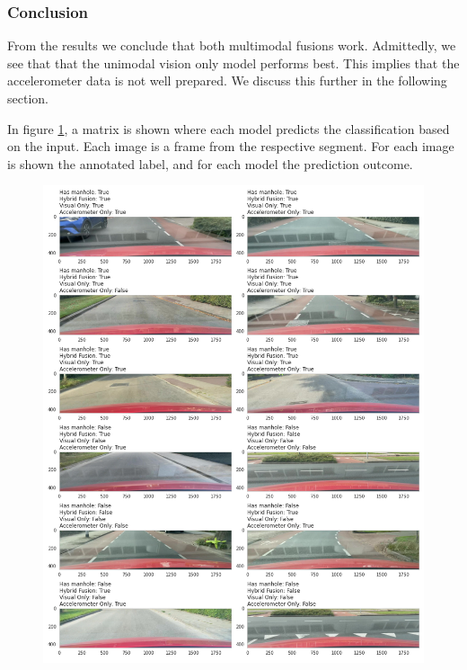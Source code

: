 \subsubsection{Conclusion}

From the results we conclude that both multimodal fusions work. Admittedly, we see that that the unimodal vision only model performs best. This implies that the accelerometer data is not well prepared. We discuss this further in the following section.

In figure \ref{fig:example-classifications}, a matrix is shown where each model predicts the classification based on the input. Each image is a frame from the respective segment. For each image is shown the annotated label, and for each model the prediction outcome.


\begin{figure}[t]
\begin{center}
\includegraphics[width=\textwidth]{images/6_results/example-predictions-2.png}
\captionsetup{width=0.90\textwidth}
\label{fig:example-classifications}
\end{center}
\end{figure}
